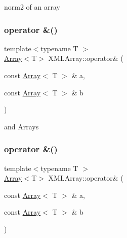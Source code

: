 norm2 of an array 

\mbox{\label{namespaceXMLArray_a4e97a656e19bfbb4c5574c3a60b2ed93}} 
\subsubsection{\texorpdfstring{operator \&()}{operator \&()}\hspace{0.1cm}{\footnotesize\ttfamily [1/2]}}
{\footnotesize\ttfamily template$<$typename T $>$ \\
\mbox{\hyperlink{classXMLArray_1_1Array}{Array}}$<$T$>$ X\+M\+L\+Array\+::operator\& (\begin{DoxyParamCaption}\item[{const \mbox{\hyperlink{classXMLArray_1_1Array}{Array}}$<$ T $>$ \&}]{a,  }\item[{const \mbox{\hyperlink{classXMLArray_1_1Array}{Array}}$<$ T $>$ \&}]{b }\end{DoxyParamCaption})\hspace{0.3cm}{\ttfamily [inline]}}



and Arrays 

\mbox{\label{namespaceXMLArray_a4e97a656e19bfbb4c5574c3a60b2ed93}} 
\subsubsection{\texorpdfstring{operator \&()}{operator \&()}\hspace{0.1cm}{\footnotesize\ttfamily [2/2]}}
{\footnotesize\ttfamily template$<$typename T $>$ \\
\mbox{\hyperlink{classXMLArray_1_1Array}{Array}}$<$T$>$ X\+M\+L\+Array\+::operator\& (\begin{DoxyParamCaption}\item[{const \mbox{\hyperlink{classXMLArray_1_1Array}{Array}}$<$ T $>$ \&}]{a,  }\item[{const \mbox{\hyperlink{classXMLArray_1_1Array}{Array}}$<$ T $>$ \&}]{b }\end{DoxyParamCaption})\hspace{0.3cm}{\ttfamily [inline]}}



